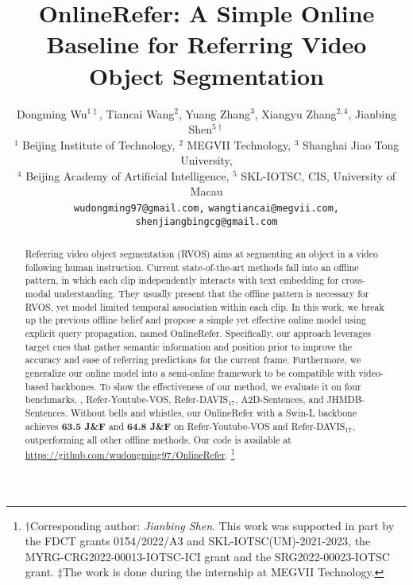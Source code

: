 \documentclass[10pt,twocolumn,letterpaper]{article}
\newcommand\blfootnote[1]{\begingroup
  \renewcommand\thefootnote{}\footnote{#1}\addtocounter{footnote}{-1}\endgroup
}
\begin{document}
\title{OnlineRefer: A Simple Online Baseline for Referring Video Object Segmentation}

\author{
Dongming Wu$^{1\ddagger}$,
Tiancai Wang$^2$,
Yuang Zhang$^3$,
Xiangyu Zhang$^{2,4}$,
Jianbing Shen$^{5\dagger}$\\
$^1$ Beijing Institute of Technology,
$^2$ MEGVII Technology, 
$^3$ Shanghai Jiao Tong University,\\
$^4$ Beijing Academy of Artificial Intelligence,
$^5$ SKL-IOTSC, CIS, University of Macau \\
{\tt\small wudongming97@gmail.com,}
{\tt\small wangtiancai@megvii.com,}
{\tt\small shenjiangbingcg@gmail.com}
}

\maketitle
\ificcvfinal\thispagestyle{empty}\fi

\begin{abstract}

Referring video object segmentation (RVOS) aims at segmenting an object in a video following human instruction. Current state-of-the-art methods fall into an offline pattern, in which each clip independently interacts with text embedding for cross-modal understanding. They usually present that the offline pattern is necessary for RVOS, yet model limited temporal association within each clip. In this work, we break up the previous offline belief and propose a simple yet effective online model using explicit query propagation, named OnlineRefer. Specifically, our approach leverages target cues that gather semantic information and position prior to improve the accuracy and ease of referring predictions for the current frame. Furthermore, we generalize our online model into a semi-online framework to be compatible with video-based backbones. To show the effectiveness of our method, we evaluate it on four benchmarks, \ie, Refer-Youtube-VOS, Refer-DAVIS$_{17}$, A2D-Sentences, and JHMDB-Sentences.  Without bells and whistles, our OnlineRefer with a Swin-L backbone achieves\textbf{ 63.5 J\&F} and \textbf{64.8 J\&F} on Refer-Youtube-VOS and Refer-DAVIS$_{17}$, outperforming all other offline methods. Our code is available at \href{https://github.com/wudongming97/OnlineRefer}{https://github.com/wudongming97/OnlineRefer}.
\blfootnote{$\dagger$Corresponding author: \textit{Jianbing Shen}. This work was supported in part by the FDCT grants 0154/2022/A3 and SKL-IOTSC(UM)-2021-2023,
the MYRG-CRG2022-00013-IOTSC-ICI grant and the SRG2022-00023-IOTSC grant.
$\ddagger$The work is done during the internship at MEGVII Technology.
}
 
\end{abstract}
\end{document}
